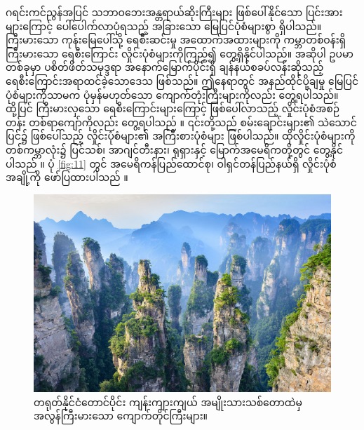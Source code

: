 \documentclass[10pt,twocolumn,letterpaper]{article}
\begin{document}
ဂရင်းကင်ညွန်အပြင် သဘာဝဘေးအန္တရာယ်ဆိုးကြီးများ ဖြစ်ပေါ်နိုင်သော ပြင်းအားများကြောင့် ပေါ်ပေါက်လာပုံရသည့် အခြားသော မြေပြင်ပုံစံများစွာ ရှိပါသည်။ ကြီးမားသော ကုန်းမြေပေါ်သို့ ရေစီးဆင်းမှု အထောက်အထားများကို ကမ္ဘာတစ်ဝန်းရှိ ကြီးမားသော ရေစီးကြောင်း လှိုင်းပုံစံများကိုကြည့်၍ တွေ့ရှိနိုင်ပါသည်။ အဆိုပါ ဥပမာတစ်ခုမှာ ပစိတ်ဖိတ်သမုဒ္ဒရာ အနောက်မြောက်ပိုင်းရှိ ချန်နယ်စခပ်လန်းဆိုသည့် ရေစီးကြောင်းအရာထင်ခဲ့သောဒေသ ဖြစ်သည်။ ဤနေရာတွင် အနည်ထိုင်ပို့ချမှု မြေပြင်ပုံစံများကိုသာမက ပုံမှန်မဟုတ်သော ကျောက်တုံးကြီးများကိုလည်း တွေ့ရပါသည်။ ထို့ပြင် ကြီးမားလှသော ရေစီးကြောင်းများကြောင့် ဖြစ်ပေါ်လာသည့် လှိုင်းပုံစံအစဉ်တန်း တစ်ရာကျော်ကိုလည်း တွေ့ရပါသည် \cite{78,79} ။ ၎င်းတို့သည် စမ်းချောင်းများ၏ သဲသောင်ပြင်၌ ဖြစ်ပေါ်သည့် လှိုင်းပုံစံများ၏ အကြီးစားပုံစံများ ဖြစ်ပါသည်။ ထိုလှိုင်းပုံစံများကို တစ်ကမ္ဘာလုံး၌ ပြင်သစ်၊ အာဂျင်တီးနား၊ ရုရှားနှင့် မြောက်အမေရိကတို့တွင် တွေ့နိုင်ပါသည် \cite{81} ။ ပုံ \ref{fig:11} တွင် အမေရိကန်ပြည်ထောင်စု၊ ဝါရှင်တန်ပြည်နယ်ရှိ လှိုင်းပုံစံအချို့ကို ဖော်ပြထားပါသည် \cite{80}။

\begin{figure}[b]
\begin{center}
   \includegraphics[width=1\linewidth]{zhangjiajie.jpg}
\end{center}
   \caption{တရုတ်နိုင်ငံတောင်ပိုင်း ကျန်းကျားကျယ် အမျိုးသားသစ်တောထဲမှ အလွန်ကြီးမားသော ကျောက်တိုင်ကြီးများ။}
\label{fig:12}
\label{fig:onecol}
\end{figure}
\end{document}
